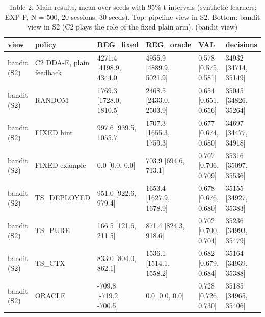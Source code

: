 \begin{table}[H]
\caption{Table 2. Main results, mean over seeds with 95\% t-intervals (synthetic learners; EXP-P, N = 500, 20 sessions, 30 seeds). Top: pipeline view in S2. Bottom: bandit view in S2 (C2 plays the role of the fixed plain arm). (bandit view)}
\label{tab:table2b_bandit}
\centering
\small
\begin{tabular}{llllll}
\toprule
view & policy & REG\_fixed & REG\_oracle & VAL & decisions \\
\midrule
bandit (S2) & C2 DDA-E, plain feedback & 4271.4 [4198.9, 4344.0] & 4955.9 [4889.9, 5021.9] & 0.578 [0.575, 0.581] & 34932 [34714, 35149] \\
bandit (S2) & RANDOM & 1769.3 [1728.0, 1810.5] & 2468.5 [2433.0, 2503.9] & 0.654 [0.651, 0.656] & 35045 [34826, 35264] \\
bandit (S2) & FIXED hint & 997.6 [939.5, 1055.7] & 1707.3 [1655.3, 1759.3] & 0.677 [0.674, 0.680] & 34697 [34477, 34918] \\
bandit (S2) & FIXED example & 0.0 [0.0, 0.0] & 703.9 [694.6, 713.1] & 0.707 [0.706, 0.709] & 35316 [35097, 35536] \\
bandit (S2) & TS\_DEPLOYED & 951.0 [922.6, 979.4] & 1653.4 [1627.9, 1678.9] & 0.678 [0.676, 0.680] & 35155 [34927, 35383] \\
bandit (S2) & TS\_PURE & 166.5 [121.6, 211.5] & 871.4 [824.3, 918.6] & 0.702 [0.700, 0.704] & 35236 [34993, 35479] \\
bandit (S2) & TS\_CTX & 833.0 [804.0, 862.1] & 1536.1 [1514.1, 1558.2] & 0.682 [0.679, 0.684] & 35164 [34939, 35388] \\
bandit (S2) & ORACLE & -709.8 [-719.2, -700.5] & 0.0 [0.0, 0.0] & 0.728 [0.726, 0.730] & 35185 [34965, 35406] \\
\bottomrule
\end{tabular}
\end{table}
